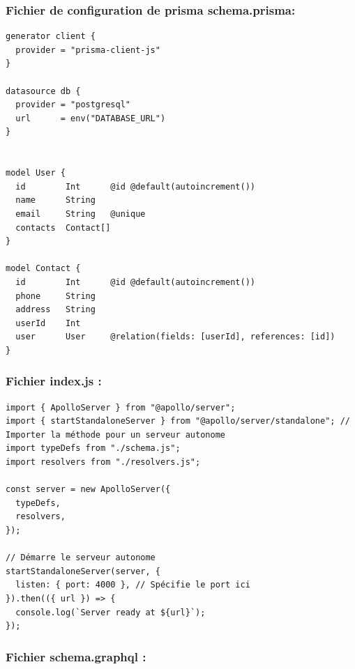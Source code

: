 \documentclass[a4paper,12pt]{article}
\begin{document}
\subsubsection{Fichier de configuration de prisma \textbf{schema.prisma}:}

\begin{verbatim}
generator client {
  provider = "prisma-client-js"
}

datasource db {
  provider = "postgresql"
  url      = env("DATABASE_URL")
}


model User {
  id        Int      @id @default(autoincrement())
  name      String
  email     String   @unique
  contacts  Contact[]
}

model Contact {
  id        Int      @id @default(autoincrement())
  phone     String
  address   String
  userId    Int
  user      User     @relation(fields: [userId], references: [id])
}
\end{verbatim}

\subsubsection{Fichier index.js :}

\begin{verbatim}
import { ApolloServer } from "@apollo/server";
import { startStandaloneServer } from "@apollo/server/standalone"; // Importer la méthode pour un serveur autonome
import typeDefs from "./schema.js";
import resolvers from "./resolvers.js";

const server = new ApolloServer({
  typeDefs,
  resolvers,
});

// Démarre le serveur autonome
startStandaloneServer(server, {
  listen: { port: 4000 }, // Spécifie le port ici
}).then(({ url }) => {
  console.log(`Server ready at ${url}`);
});
\end{verbatim}

\subsubsection{Fichier schema.graphql :}
\end{document}
